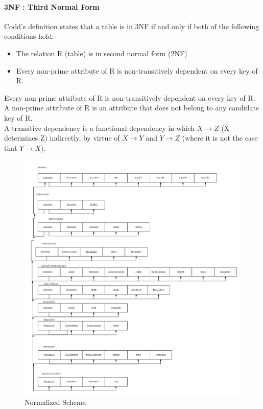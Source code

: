 \documentclass[12pt]{report}
\begin{document}
\paragraph*{3NF : Third Normal Form}
Codd's definition states that a table is in 3NF if and only if both of the following conditions hold:-
\begin{itemize}
\item The relation R (table) is in second normal form (2NF)
\item Every non-prime attribute of R is non-transitively dependent on every key of R.
\end{itemize}

Every non-prime attribute of R is non-transitively dependent on every key of R.
A non-prime attribute of R is an attribute that does not belong to any candidate key of R.\\
 A transitive dependency is a functional dependency in which 
 $ X \rightarrow Z $ (X determines Z) indirectly, by virtue of $X \rightarrow Y$ and $Y \rightarrow Z$ (where it is not the case that $Y \rightarrow X$). 
 
\begin{figure}[!htb]
    \centering
    \includegraphics[width=1.25\textwidth]{Normalized-Tables.png}
    \caption{Normalized Schema}
    \label{fig:Normalized Schema}
\end{figure}
 
\end{document}
